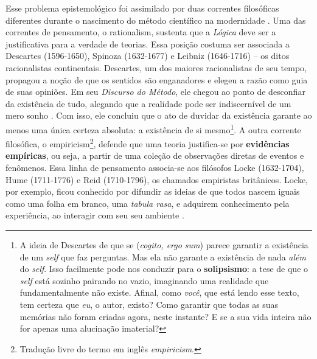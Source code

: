 \documentclass[./main.tex]{subfiles}
\begin{document}
\par Esse problema epistemológico foi assimilado por duas correntes filosóficas diferentes durante o nascimento do método científico na modernidade \cite{sep-rationalism-empiricism}. Uma das correntes de pensamento, o \gls{rationalism}, sustenta que a \textit{Lógica} deve ser a justificativa para a verdade de teorias. Essa posição costuma ser associada a Descartes (1596-1650), Spinoza (1632-1677) e Leibniz (1646-1716) -- os ditos racionalistas continentais. Descartes, um dos maiores racionalistas de seu tempo, propagou a noção de que os sentidos são enganadores e elegeu a razão como guia de suas opiniões. Em seu \textit{Discurso do Método}, ele chegou ao ponto de desconfiar da existência de tudo, alegando que a realidade pode ser indiscernível de um mero sonho \cite{descartes2008discurso}. Com isso, ele concluiu que o ato de duvidar da existência garante ao menos uma única certeza absoluta: a existência de si mesmo\footnote{A ideia de Descartes de que se  (\textit{cogito, ergo sum}) parece garantir a existência de um \textit{self} que faz perguntas. Mas ela não garante a existência de nada \textit{além} do \textit{self}. Isso facilmente pode nos conduzir para o \textbf{solipsismo}: a tese de que o \textit{self} está sozinho pairando no vazio, imaginando uma realidade que fundamentalmente não existe. Afinal, como \textit{você}, que está lendo esse texto, tem certeza que \textit{eu}, o autor, existo? Como garantir que todas as suas memórias não foram criadas agora, neste instante?  E se a sua vida inteira não for apenas uma alucinação imaterial?}. A outra corrente filosófica, o \gls{empiricism}\footnote{Tradução livre do termo em inglês \textit{empiricism}.}, defende que uma teoria justifica-se por \textbf{evidências empíricas}, ou seja, a partir de uma coleção de observações diretas de eventos e fenômenos. Essa linha de pensamento associa-se aos filósofos Locke (1632-1704), Hume (1711-1776) e Reid (1710-1796), os chamados empiristas britânicos. Locke, por exemplo, ficou conhecido por difundir as ideias de que todos nascem iguais como uma folha em branco, uma \textit{tabula rasa}, e adquirem conhecimento pela experiência, ao interagir com seu seu ambiente \cite{sep-locke}. 
\end{document}
